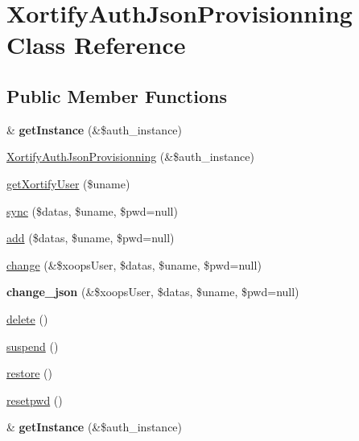 \hypertarget{class_xortify_auth_json_provisionning}{\section{Xortify\-Auth\-Json\-Provisionning Class Reference}
\label{class_xortify_auth_json_provisionning}
}
\subsection*{Public Member Functions}
\begin{DoxyCompactItemize}
\item 
\hypertarget{class_xortify_auth_json_provisionning_a2c8eaa915c70d75289ac8a03686194f9}{\& {\bfseries get\-Instance} (\&\$auth\-\_\-instance)}\label{class_xortify_auth_json_provisionning_a2c8eaa915c70d75289ac8a03686194f9}

\item 
\hyperlink{class_xortify_auth_json_provisionning_acaf0cac25f9cd967c0329db929627521}{Xortify\-Auth\-Json\-Provisionning} (\&\$auth\-\_\-instance)
\item 
\hyperlink{class_xortify_auth_json_provisionning_a041d726ac26672547ed1504e8e0117aa}{get\-Xortify\-User} (\$uname)
\item 
\hyperlink{class_xortify_auth_json_provisionning_a35dc08b0f2138eb818ff95345b73bcff}{sync} (\$datas, \$uname, \$pwd=null)
\item 
\hyperlink{class_xortify_auth_json_provisionning_adfc9fcef01e7bd7b2f47e8e79d51fc63}{add} (\$datas, \$uname, \$pwd=null)
\item 
\hyperlink{class_xortify_auth_json_provisionning_ae1f0971b9712c794620cf309164e43af}{change} (\&\$xoops\-User, \$datas, \$uname, \$pwd=null)
\item 
\hypertarget{class_xortify_auth_json_provisionning_a94f4e0408f26e65abca347ec883f4ec9}{{\bfseries change\-\_\-json} (\&\$xoops\-User, \$datas, \$uname, \$pwd=null)}\label{class_xortify_auth_json_provisionning_a94f4e0408f26e65abca347ec883f4ec9}

\item 
\hyperlink{class_xortify_auth_json_provisionning_a13bdffdd926f26b825ea57066334ff01}{delete} ()
\item 
\hyperlink{class_xortify_auth_json_provisionning_ad73006a505121228f3b075c2409787d2}{suspend} ()
\item 
\hyperlink{class_xortify_auth_json_provisionning_aa1371f22826cf8cde4454c9b467203d0}{restore} ()
\item 
\hyperlink{class_xortify_auth_json_provisionning_a06d70fbd3a2db390b6f2530c0076628e}{resetpwd} ()
\item 
\hypertarget{class_xortify_auth_json_provisionning_a2c8eaa915c70d75289ac8a03686194f9}{\& {\bfseries get\-Instance} (\&\$auth\-\_\-instance)}\label{class_xortify_auth_json_provisionning_a2c8eaa915c70d75289ac8a03686194f9}


\end{DoxyCompactItemize}
